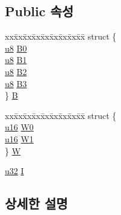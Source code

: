 \subsection*{Public 속성}
\begin{DoxyCompactItemize}
\item 
\begin{tabbing}
xx\=xx\=xx\=xx\=xx\=xx\=xx\=xx\=xx\=\kill
struct \{\\
\>\mbox{\hyperlink{_system_8h_aed742c436da53c1080638ce6ef7d13de}{u8}} \mbox{\hyperlink{unionreg__pair_a6dd2fb2300fcd64f13193c60a691193b}{B0}}\\
\>\mbox{\hyperlink{_system_8h_aed742c436da53c1080638ce6ef7d13de}{u8}} \mbox{\hyperlink{unionreg__pair_a6ae44acc4062508a89704a00fcc8cdde}{B1}}\\
\>\mbox{\hyperlink{_system_8h_aed742c436da53c1080638ce6ef7d13de}{u8}} \mbox{\hyperlink{unionreg__pair_a118393dbdd124530e8512699e730cb72}{B2}}\\
\>\mbox{\hyperlink{_system_8h_aed742c436da53c1080638ce6ef7d13de}{u8}} \mbox{\hyperlink{unionreg__pair_a5860111dd570e02024b8b091b827e1e5}{B3}}\\
\} \mbox{\hyperlink{unionreg__pair_a4aa9f4a2c7db57ca409d6f6b1b9fad02}{B}}\\

\end{tabbing}\item 
\begin{tabbing}
xx\=xx\=xx\=xx\=xx\=xx\=xx\=xx\=xx\=\kill
struct \{\\
\>\mbox{\hyperlink{_system_8h_a9e6c91d77e24643b888dbd1a1a590054}{u16}} \mbox{\hyperlink{unionreg__pair_abc166c5e9cdf387119821685a96bcc30}{W0}}\\
\>\mbox{\hyperlink{_system_8h_a9e6c91d77e24643b888dbd1a1a590054}{u16}} \mbox{\hyperlink{unionreg__pair_a37144044fd8cda6dccc874086212be44}{W1}}\\
\} \mbox{\hyperlink{unionreg__pair_aaa63aa528e9ef659bfefa9ae70aa05b0}{W}}\\

\end{tabbing}\item 
\mbox{\hyperlink{_system_8h_a10e94b422ef0c20dcdec20d31a1f5049}{u32}} \mbox{\hyperlink{unionreg__pair_a9f6a42d56c07829d7013571eda998252}{I}}
\end{DoxyCompactItemize}


\subsection{상세한 설명}


